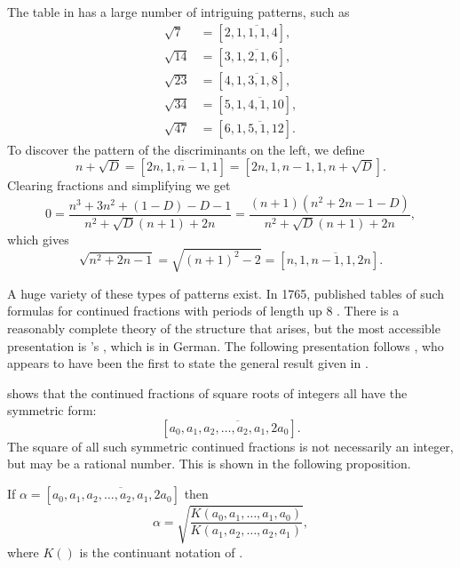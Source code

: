 The table in  has a large number of
intriguing patterns, such as
\[
\begin{aligned}
\sqrt{7}  & = [2,\overline{1, 1, 1, 4}], \\
\sqrt{14} & = [3,\overline{1, 2, 1, 6}], \\
\sqrt{23} & = [4,\overline{1, 3, 1, 8}], \\
\sqrt{34} & = [5,\overline{1, 4, 1, 10}], \\
\sqrt{47} & = [6,\overline{1, 5, 1, 12}].
\end{aligned}
\]
To discover the pattern of the discriminants on the left, we define
\[
n + \sqrt{D} = [\overline{2n, 1, n-1, 1}] = [2n, 1, n-1, 1, n+ \sqrt{D}].
\]
Clearing fractions and simplifying we get
\[
0 = \frac{n^3 + 3n^2 + (1-D) - D -1}{n^2+\sqrt{D}(n+1)+2n}
=\frac{(n+1)(n^2+2n - 1 -D)}{n^2+\sqrt{D}(n+1)+2n},
\]
which gives
\[
\sqrt{n^2+2n-1} = \sqrt{(n+1)^2-2} = [n, \overline{1, n-1, 1, 2n}].
\]

A huge variety of these types of patterns exist.  In 1765, {\Euler}
published tables of such formulas for continued fractions with periods
of length up $8$ \cite{Euler:Pell}.  There is a reasonably complete
theory of the structure that arises, but the most accessible
presentation is {\Perron}'s \cite{Perron:CF}, which is in German.  The following
presentation follows {\MuirT} \cite{Muir:Surds:74}, who appears to
have been the first to state the general result given in
.

 shows that the continued fractions of
square roots of integers all have the symmetric form:
\begin{equation} \label{CF:Symmetric:Eq}
[a_0, \overline{a_1, a_2, \ldots, a_2, a_1, 2a_0}].
\end{equation}
The square of all such symmetric continued fractions is not
necessarily an integer, but may be a rational number.  This is shown
in the following proposition.

\begin{proposition}\label{CF:Sqrt:Sym:Prop}
If $\alpha = [a_0, \overline{a_1, a_2, \ldots, a_2, a_1, 2a_0}]$
then 
\[
\alpha = \sqrt{\frac{K(a_0, a_1, \ldots, a_1, a_0)}{K(a_1, a_2,
\ldots,a_2, a_1)}},
\]
where $K()$ is the continuant notation of .
\end{proposition}

